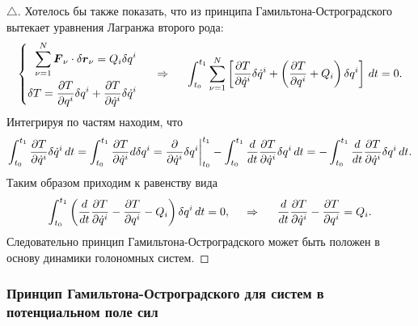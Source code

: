 \begin{proof}[$\triangle$]
    Хотелось бы также показать, что из принципа Гамильтона-Остроградского вытекает уравнения Лагранжа второго рода:
\begin{equation*}
    \left\{\begin{aligned}
        \sum_{\nu=1}^N \mbox{\boldmath $F$}_\nu \cdot \delta \mbox{\boldmath $r$}_\nu = Q_i \delta q^i \\
        \delta T = \frac{\partial T}{\partial q^i} \delta q^i + \frac{\partial T}{\partial \dot{q}^i} \delta \dot{q}^i
    \end{aligned}\right.
    \hspace{0.5cm} \Rightarrow \hspace{0.5cm} 
    \int_{t_0}^{t_1} \sum_{\nu=1}^N 
    \left[
        \frac{\partial T}{\partial \dot{q}^i} \delta \dot{q}^i + \left(
            \frac{\partial T}{\partial q^i} + Q_i
        \right) \delta q^i
    \right] \, d t = 0.
\end{equation*}
Интегрируя по частям находим, что
\begin{equation*}
    \int_{t_0}^{t_1} \frac{\partial T}{\partial \dot{q}^i} \delta \dot{q}^i \, d t 
    = 
    \int_{t_0}^{t_1} \frac{\partial T}{\partial \dot{q}^i} d \delta q^i 
    = 
    \frac{\partial }{\partial \dot{q}^i} \delta q^i \bigg|_{t_0}^{t_1} 
    - \int_{t_0}^{t_1} \frac{d }{d t} \frac{\partial T}{\partial \dot{q}^i} \delta q^i \, d t 
    = 
    - \int_{t_0}^{t_1} \frac{d }{d t} \frac{\partial T}{\partial \dot{q}^i} \delta q^i \, d t.
\end{equation*}
Таким образом приходим к равенству вида
\begin{equation*}
    \int_{t_0}^{t_1} \left(
        \frac{d }{d t} \frac{\partial T}{\partial \dot{q}^i} - \frac{\partial T}{\partial q^i} - Q_i
    \right) \delta q^i \, d t = 0,
    \hspace{0.5cm} \Rightarrow \hspace{0.5cm} 
    \frac{d }{d t} \frac{\partial T}{\partial \dot{q}^i} - \frac{\partial T}{\partial q^i} = Q_i.
\end{equation*}
Следовательно принцип Гамильтона-Остроградского может быть положен в основу динамики голономных систем.
\end{proof}



\subsubsection*{Принцип Гамильтона-Остроградского для систем в потенциальном поле сил}

